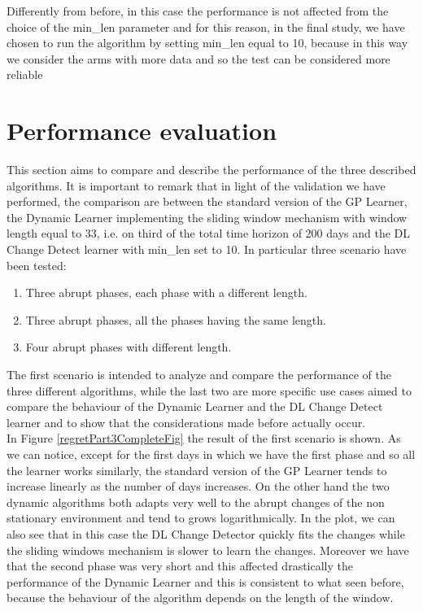 Differently from before, in this case the performance is not affected from the choice of the min\_len parameter and for this reason, in the final study, we have chosen to run the algorithm by setting min\_len equal to 10, because in this way we consider the arms with more data and so the test can be considered more reliable


\section{Performance evaluation}

This section aims to compare and describe the performance of the three described algorithms.
It is important to remark that in light of the validation we have performed, the comparison are between the standard version of the GP Learner, the Dynamic Learner implementing the sliding window mechanism with window length equal to 33, i.e. on third of the total time horizon of 200 days and the DL Change Detect learner with min\_len set to 10.
In particular three scenario have been tested:

\begin{enumerate}
\item Three abrupt phases, each phase with a different length.
\item Three abrupt phases, all the phases having the same length.
\item Four abrupt phases with different length.
\end{enumerate}

The first scenario is intended to analyze and compare the performance of the three different algorithms, while the last two are more specific use cases aimed to compare the behaviour of the Dynamic Learner and the DL Change Detect learner and to show that the considerations made before actually occur.\\
In Figure \ref{regretPart3CompleteFig} the result of the first scenario is shown. As we can notice, except for the first days in which we have the first phase and so all the learner works similarly, the standard version of the GP Learner tends to increase linearly as the number of days increases. On the other hand the two dynamic algorithms both adapts very well to the abrupt changes of the non stationary environment and tend to grows logarithmically. In the plot, we can also see that in this case the DL Change Detector quickly fits the changes while the sliding windows mechanism is slower to learn the changes. Moreover we have that the second phase was very short and this affected drastically the performance of the Dynamic Learner and this is consistent to what seen before, because the behaviour of the algorithm depends on the length of the window. 

